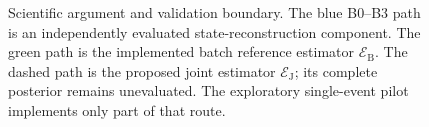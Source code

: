 \begin{figure}[t]
\centering
\resizebox{\textwidth}{!}{}
\caption{Scientific argument and validation boundary. The blue B0--B3 path is an independently evaluated state-reconstruction component. The green path is the implemented batch reference estimator $\mathcal E_{\mathrm B}$. The dashed path is the proposed joint estimator $\mathcal E_{\mathrm J}$; its complete posterior remains unevaluated. The exploratory single-event pilot implements only part of that route.}
\label{fig:joint-architecture}
\end{figure}
